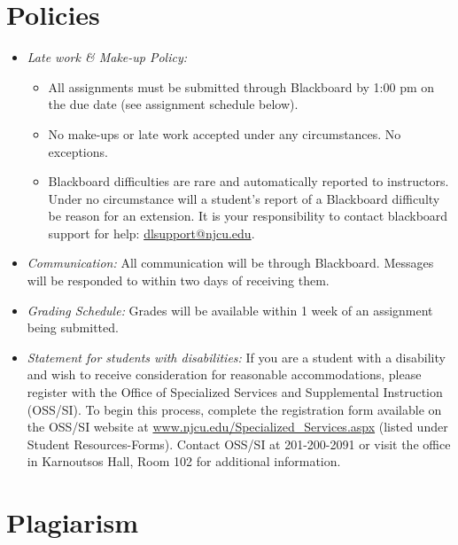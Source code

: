 \documentclass[11pt,article,oneside]{memoir}
\begin{document}
\section{Policies}

\begin{itemize}
\item \textit{Late work \& Make-up Policy:} 
\begin{itemize}
\item All assignments must be submitted through Blackboard by 1:00 pm on the due date (see assignment schedule below).
\item  No make-ups or late work accepted under any circumstances. No exceptions. 
\item Blackboard difficulties are rare and automatically reported to instructors. Under no circumstance will a student's report of a Blackboard difficulty be reason for an extension. It is your responsibility to contact blackboard support for help: \href{dlsupport@njcu.edu}{dlsupport@njcu.edu}. 

\end{itemize}



\item \textit{Communication:} All communication will be through Blackboard. Messages will be responded to within two
days of receiving them. 

\item \textit{Grading Schedule:} Grades will be available within 1 week of an assignment being submitted.



\item \textit{Statement for students with disabilities:} If you are a student
with a disability and wish to receive consideration for reasonable
accommodations, please register with the Office of Specialized Services
and Supplemental Instruction (OSS/SI). To begin this process, complete
the registration form available on the OSS/SI website at
\href{http://www.njcu.edu/Specialized_Services.aspx}{www.njcu.edu/Specialized\_Services.aspx}
(listed under Student Resources-Forms). Contact OSS/SI at 201-200-2091
or visit the office in Karnoutsos Hall, Room 102 for additional
information.
\end{itemize}

\section{Plagiarism}
\end{document}
